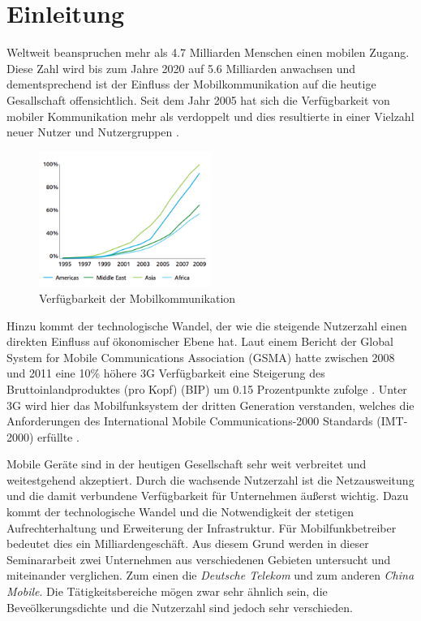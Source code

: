 \section{Einleitung}

Weltweit beanspruchen mehr als 4.7 Milliarden Menschen einen mobilen Zugang. Diese Zahl wird bis zum Jahre 2020 auf 5.6 Milliarden anwachsen \cite{gsma2016} und dementsprechend ist der Einfluss der Mobilkommunikation auf die heutige Gesallschaft offensichtlich. Seit dem Jahr 2005 hat sich die Verfügbarkeit von mobiler Kommunikation mehr als verdoppelt und dies resultierte in einer Vielzahl neuer Nutzer und Nutzergruppen \cite{gsma2012}.

\begin{figure}[H]
\centering
\includegraphics[width=0.5\textwidth]{pictures/mobpen.png}
\caption{Verfügbarkeit der Mobilkommunikation}
\label{fig:mobpen}
\end{figure}

Hinzu kommt der technologische Wandel, der wie die steigende Nutzerzahl einen direkten Einfluss auf ökonomischer Ebene hat. Laut einem Bericht der Global System for Mobile Communications Association (GSMA) hatte zwischen 2008 und 2011 eine 10\% höhere 3G Verfügbarkeit eine Steigerung des Bruttoinlandproduktes (pro Kopf) (BIP) um 0.15 Prozentpunkte zufolge \cite{gsma2012}. Unter 3G wird hier das Mobilfunksystem der dritten Generation verstanden, welches die Anforderungen des International Mobile Communications-2000 Standards (IMT-2000) erfüllte \cite{schiller2003mobile}.   

Mobile Geräte sind in der heutigen Gesellschaft sehr weit verbreitet und weitestgehend akzeptiert. Durch die wachsende Nutzerzahl ist die Netzausweitung und die damit verbundene Verfügbarkeit für Unternehmen äußerst wichtig. Dazu kommt der technologische Wandel und die Notwendigkeit der stetigen Aufrechterhaltung und Erweiterung der Infrastruktur. Für Mobilfunkbetreiber bedeutet dies ein Milliardengeschäft. Aus diesem Grund werden in dieser Seminararbeit zwei Unternehmen aus verschiedenen Gebieten untersucht und miteinander verglichen. Zum einen die \textit{Deutsche Telekom} und zum anderen \textit{China Mobile}. Die Tätigkeitsbereiche mögen zwar sehr ähnlich sein, die Beveölkerungsdichte und die Nutzerzahl sind jedoch sehr verschieden. 

